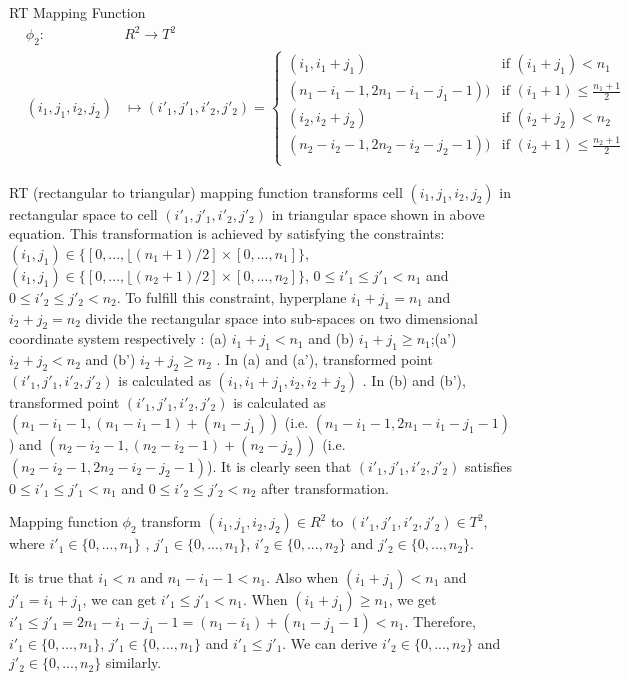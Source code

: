 \documentclass[AMA,LATO1COL]{WileyNJD-v2}
\begin{document}
\begin{definition}
RT Mapping Function
\begin{eqnarray}
&\phi_2:&   R^2 \rightarrow  T^2  \\
&(i_1,j_1,i_2,j_2)& \mapsto (i'_1,j'_1,i'_2,j'_2)=
  \begin{cases}
   (i_1,i_1+j_1) & \text{if } (i_1+j_1) < n_1 \\
   (n_1-i_1-1,2n_1-i_1-j_1-1))  & \text{if } (i_1+1) \leq \frac{n_1+1}{2} \\
   (i_2,i_2+j_2) & \text{if } (i_2+j_2) < n_2 \\
   (n_2-i_2-1,2n_2-i_2-j_2-1))  & \text{if } (i_2+1) \leq \frac{n_2+1}{2} \\
  \end{cases}
\end{eqnarray}
\end{definition}
RT (rectangular to triangular) mapping function transforms cell $(i_1,j_1,i_2,j_2)$ in rectangular space to cell $(i'_1,j'_1,i'_2,j'_2)$ in triangular space shown in above equation. This transformation is achieved by satisfying the constraints: $(i_1,j_1)\in \{[0,...,\lfloor (n_1+1)/2] \times [0,...,n_1]\}$,$(i_1,j_1)\in \{[0,...,\lfloor (n_2+1)/2] \times [0,...,n_2]\}$,  $0\leq i'_1 \leq j'_1<n_1$ and  $0\leq i'_2 \leq j'_2<n_2$. To fulfill this constraint, hyperplane $i_1+j_1=n_1$ and $i_2+j_2=n_2$ divide the rectangular space into sub-spaces on two dimensional coordinate system respectively : (a) $i_1+j_1<n_1$ and (b) $i_1+j_1\geq n_1$;(a') $i_2+j_2<n_2$ and (b') $i_2+j_2\geq n_2$ . In (a) and (a'), transformed point $(i'_1,j'_1,i'_2,j'_2)$ is calculated as $(i_1,i_1+j_1,i_2,i_2+j_2)$ . In (b) and (b'), transformed point $(i'_1,j'_1,i'_2,j'_2)$ is calculated as $(n_1-i_1-1,(n_1-i_1-1)+(n_1-j_1))$ (i.e. $(n_1-i_1-1,2n_1-i_1-j_1-1)$) and $(n_2-i_2-1,(n_2-i_2-1)+(n_2-j_2))$ (i.e. $(n_2-i_2-1,2n_2-i_2-j_2-1)$). It is clearly seen that $(i'_1,j'_1,i'_2,j'_2)$ satisfies $0\leq i'_1 \leq j'_1<n_1$ and $0\leq i'_2 \leq j'_2<n_2$ after transformation.

\begin{lemma}
Mapping function $\phi_2$ transform $(i_1,j_1,i_2,j_2) \in R^2$ to $(i'_1,j'_1,i'_2,j'_2)\in T^2 $, where $i'_1 \in \{0,...,n_1\}$ , $j'_1 \in \{0,...,n_1\}$, $i'_2 \in \{0,...,n_2\}$ and $j'_2 \in \{0,...,n_2\}$.
\end{lemma}
It is true that $i_1<n$ and $n_1-i_1-1<n_1$. Also when $(i_1+j_1) < n_1$ and $j'_1=i_1+j_1$, we can get $i'_1\leq j'_1<n_1$. When $(i_1+j_1) \geq n_1$, we get $i'_1\leq j'_1=2n_1-i_1-j_1-1=(n_1-i_1)+(n_1-j_1-1)<n_1$. Therefore,$i'_1 \in \{0,...,n_1\}$, $j'_1 \in \{0,...,n_1\}$ and $i'_1\leq j'_1$. We can derive $i'_2 \in \{0,...,n_2\}$ and $j'_2 \in \{0,...,n_2\}$ similarly.
\end{document}
